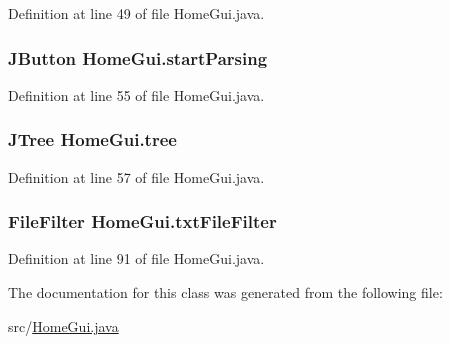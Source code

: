 Definition at line 49 of file Home\-Gui.\-java.

\hypertarget{class_home_gui_aedb975e31137435a02772599392bf195}{
\subsubsection[{start\-Parsing}]{\setlength{\rightskip}{0pt plus 5cm}J\-Button {\bf Home\-Gui.\-start\-Parsing}}}\label{class_home_gui_aedb975e31137435a02772599392bf195}


Definition at line 55 of file Home\-Gui.\-java.

\hypertarget{class_home_gui_ab4af4f54e925eedcab3cb87da41410e1}{
\subsubsection[{tree}]{\setlength{\rightskip}{0pt plus 5cm}J\-Tree {\bf Home\-Gui.\-tree}}}\label{class_home_gui_ab4af4f54e925eedcab3cb87da41410e1}


Definition at line 57 of file Home\-Gui.\-java.

\hypertarget{class_home_gui_af20bf1a94a96e4f53e1f66337a257ce3}{
\subsubsection[{txt\-File\-Filter}]{\setlength{\rightskip}{0pt plus 5cm}File\-Filter {\bf Home\-Gui.\-txt\-File\-Filter}}}\label{class_home_gui_af20bf1a94a96e4f53e1f66337a257ce3}


Definition at line 91 of file Home\-Gui.\-java.



The documentation for this class was generated from the following file\-:\begin{DoxyCompactItemize}
\item 
src/\hyperlink{_home_gui_8java}{Home\-Gui.\-java}\end{DoxyCompactItemize}
